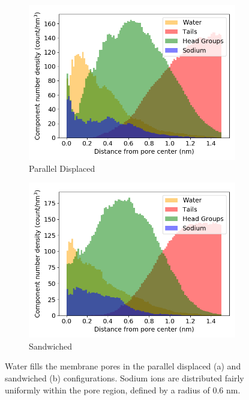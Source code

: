 \documentclass{article}
\begin{document}
  \begin{figure}
  \centering 
  \begin{subfigure}{0.45\textwidth}
        \includegraphics[width=1\linewidth]{offset_solvated_density.png}
        \caption{Parallel Displaced}
        \label{fig:offset_solvated_density}
  \end{subfigure}
  \begin{subfigure}{0.45\textwidth}
        \includegraphics[width=1\linewidth]{layered_solvated_density.png}
        \caption{Sandwiched}
        \label{fig:layered_solvated_density}
  \end{subfigure}
  \caption{Water fills the membrane pores in the parallel displaced (a) and 
  sandwiched (b) configurations. Sodium ions are distributed fairly uniformly
  within the pore region, defined by a radius of 0.6 nm.}
  \label{fig:water_density}
  \end{figure}
\end{document}
